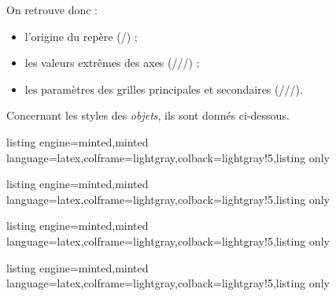 \documentclass[11pt,a4paper]{ltxdoc}
\begin{document}
On retrouve donc :

\smallskip

\begin{itemize}
	\item l'origine du repère (/) ;
	\item les valeurs extrêmes des axes (///) ;
	\item les paramètres des grilles principales et secondaires (///).
\end{itemize}

\smallskip

Concernant les styles des \textit{objets}, ils sont donnés ci-dessous.

\begin{tcblisting}{listing engine=minted,minted language=latex,colframe=lightgray,colback=lightgray!5,listing only}
\end{tcblisting}

\begin{tcblisting}{listing engine=minted,minted language=latex,colframe=lightgray,colback=lightgray!5,listing only}
\end{tcblisting}

\begin{tcblisting}{listing engine=minted,minted language=latex,colframe=lightgray,colback=lightgray!5,listing only}
\end{tcblisting}

\begin{tcblisting}{listing engine=minted,minted language=latex,colframe=lightgray,colback=lightgray!5,listing only}

\end{tcblisting}
\end{document}
